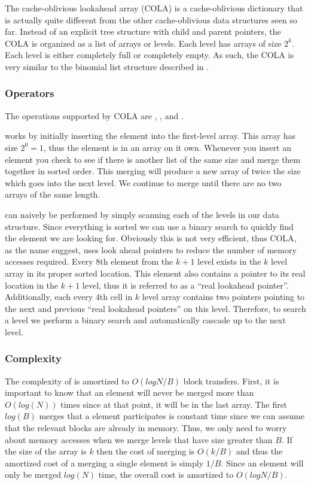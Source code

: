 \documentclass{style}
\begin{document}
The cache-oblivious lookahead array (COLA) is a cache-oblivious dictionary
that is actually quite different from the other cache-oblivious data
structures seen so far. Instead of an explicit tree structure with child and
parent pointers, the COLA is organized as a list of arrays or levels. Each
level has arrays of size $2^k$. Each level is either completely full or
completely empty. As such, the COLA is very similar to the binomial list
structure described in \cite{BentleySaxe}.

\subsubsection{Operators}

The operations supported by COLA are \Search, \Insert, and \Scan.

\Insert works by initially inserting the element into the first-level array.
This array has size $2^0 = 1$, thus the element is in an array on it own.
Whenever you insert an element you check to see if there is another list of
the same size and merge them together in sorted order. This merging will
produce a new array of twice the size which goes into the next level. We
continue to merge until there are no two arrays of the same length.

\Search can naively be performed by simply scanning each of the levels in our
data structure. Since everything is sorted we can use a binary search to
quickly find the element we are looking for. Obviously this is not very
efficient, thus COLA, as the name suggest, uses look ahead pointers to reduce
the number of memory accesses required. Every 8th element from the $k+1$ level
exists in the $k$ level array in its proper sorted location. This element also
contains a pointer to its real location in the $k+1$ level, thus it is
referred to as a ``real lookahead pointer''. Additionally, each every 4th cell
in $k$ level array contains two pointers pointing to the next and previous
``real lookahead pointers'' on this level. Therefore, to search a level we
perform a binary search and automatically cascade up to the next level.

\subsubsection{Complexity}

The complexity of \Insert is amortized to $O(log N / B)$ block transfers.
First, it is important to know that an element will never be merged more than
$O(log(N))$ times since at that point, it will be in the last array. The first
$log(B)$ merges that a element participates is constant time since we can
assume that the relevant blocks are already in memory. Thus, we only need to
worry about memory accesses when we merge levels that have size greater than
$B$. If the size of the array is $k$ then the cost of merging is $O(k/B)$ and
thus the amortized cost of a merging a single element is simply $1/B$. Since
an element will only be merged $log(N)$ time, the overall cost is amortized to
$O(logN/B)$.
\end{document}
